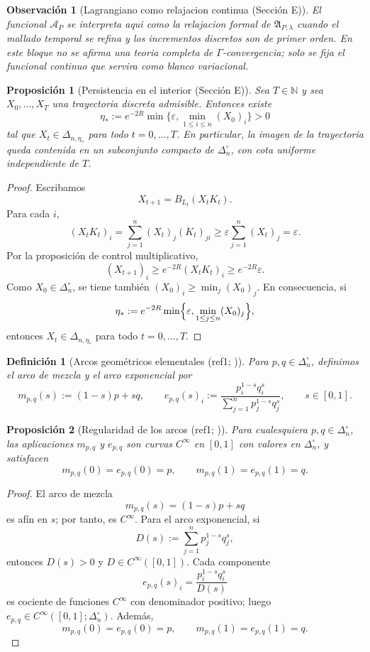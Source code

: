 ﻿\documentclass[12pt]{article}
\newcommand{\fuente}[1]{\textnormal{(#1)}}
\newcommand{\fuentecite}[2]{\textnormal{(#1; \citealp{#2})}}
\newtheorem{definicion}{Definición}[section]
\newtheorem{proposicion}{Proposición}[section]
\newtheorem{observacion}{Observación}[section]
\begin{document}
\begin{observacion}[Lagrangiano como relajacion continua \fuente{Sección E}]
El funcional \(\mathcal A_P\) se interpreta aqui como la relajacion formal de \(\mathfrak A_{P,\lambda}\) cuando el mallado temporal se refina y los incrementos discretos son de primer orden. En este bloque no se afirma una teoria completa de \(\Gamma\)-convergencia; solo se fija el funcional continuo que servira como blanco variacional.
\end{observacion}

\begin{proposicion}[Persistencia en el interior \fuente{Sección E}]
Sea \(T\in\mathbb N\) y sea \(X_0,\dots,X_T\) una trayectoria discreta admisible. Entonces existe
\[
 \eta_*:=e^{-2R}\min\!\bigl\{\varepsilon,\min_{1\le i\le n}(X_0)_i\bigr\}>0
\]
tal que \(X_t\in \Delta_{n,\eta_*}\) para todo \(t=0,\dots,T\). En particular, la imagen de la trayectoria queda contenida en un subconjunto compacto de \(\Delta_n^\circ\), con cota uniforme independiente de \(T\).
\end{proposicion}
\begin{proof}
Escribamos
\[
X_{t+1}=B_{L_t}(X_tK_t).
\]
Para cada \(i\),
\[
(X_tK_t)_i=\sum_{j=1}^n (X_t)_j (K_t)_{ji}
\ge \varepsilon\sum_{j=1}^n (X_t)_j
=\varepsilon.
\]
Por la proposición de control multiplicativo,
\[
(X_{t+1})_i\ge e^{-2R}(X_tK_t)_i\ge e^{-2R}\varepsilon.
\]
Como \(X_0\in\Delta_n^\circ\), se tiene también \((X_0)_i\ge \min_j(X_0)_j\). En consecuencia, si
\[
\eta_*:=e^{-2R}\min\Bigl\{\varepsilon,\min_{1\le j\le n}(X_0)_j\Bigr\},
\]
entonces \(X_t\in\Delta_{n,\eta_*}\) para todo \(t=0,\dots,T\).
\end{proof}

\begin{definicion}[Arcos geométricos elementales \fuentecite{ref1}{PistoneShoaib2024Axioms}]
Para \(p,q\in\Delta_n^\circ\), definimos el \emph{arco de mezcla} y el \emph{arco exponencial} por
\[
m_{p,q}(s):=(1-s)p+sq,
\qquad
e_{p,q}(s)_i:=\frac{p_i^{1-s}q_i^s}{\sum_{j=1}^n p_j^{1-s}q_j^s},
\qquad s\in[0,1].
\]
\end{definicion}

\begin{proposicion}[Regularidad de los arcos \fuentecite{ref1}{PistoneShoaib2024Axioms}]
Para cualesquiera \(p,q\in\Delta_n^\circ\), las aplicaciones \(m_{p,q}\) y \(e_{p,q}\) son curvas \(C^\infty\) en \([0,1]\) con valores en \(\Delta_n^\circ\), y satisfacen
\[
m_{p,q}(0)=e_{p,q}(0)=p,
\qquad
m_{p,q}(1)=e_{p,q}(1)=q.
\]
\end{proposicion}
\begin{proof}
El arco de mezcla
\[
m_{p,q}(s)=(1-s)p+sq
\]
es afín en \(s\); por tanto, es \(C^\infty\). Para el arco exponencial, si
\[
D(s):=\sum_{j=1}^n p_j^{1-s}q_j^s,
\]
entonces \(D(s)>0\) y \(D\in C^\infty([0,1])\). Cada componente
\[
e_{p,q}(s)_i=\frac{p_i^{1-s}q_i^s}{D(s)}
\]
es cociente de funciones \(C^\infty\) con denominador positivo; luego \(e_{p,q}\in C^\infty([0,1];\Delta_n^\circ)\). Además,
\[
m_{p,q}(0)=e_{p,q}(0)=p,
\qquad
m_{p,q}(1)=e_{p,q}(1)=q.
\]
\end{proof}
\end{document}
